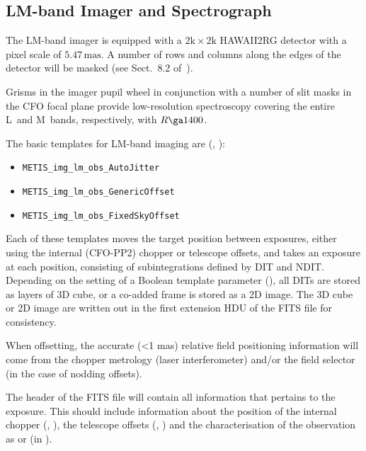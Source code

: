 
\subsection{LM-band Imager and Spectrograph}
\label{ssec:instrument_data_LM-IMG}

The LM-band imager is equipped with a $2\mathrm{k}\times2\mathrm{k}$
HAWAII2RG detector with a pixel scale of $5.47\,\mathrm{mas}$. A
number of rows and columns along the edges of the detector will be
masked (see Sect.~8.2 of~\cite{DRLS}).

Grisms in the imager pupil wheel in conjunction with a number of slit
masks in the CFO focal plane provide low-resolution spectroscopy
covering the entire L~and M~bands, respectively, with $R\ga 1400$.

The basic templates for LM-band imaging are
(\cite{METIS-operational_concept}, \cite{METIS-template_manual}):
\begin{itemize}
\item \lstinline{METIS_img_lm_obs_AutoJitter}
\item \lstinline{METIS_img_lm_obs_GenericOffset}
\item \lstinline{METIS_img_lm_obs_FixedSkyOffset}
\end{itemize}

Each of these templates moves the target position between exposures,
either using the internal (CFO-PP2) chopper or telescope offsets, and
takes an exposure at each position, consisting of subintegrations
defined by DIT and NDIT. Depending on the setting of a Boolean
template parameter (), all DITs are stored as
layers of 3D cube, or a co-added frame is stored as a 2D image.
The 3D cube or 2D image are written out in the first extension HDU of the FITS file for consistency.

When offsetting, the accurate (<1 mas) relative field positioning information will come from the chopper metrology (laser interferometer) and/or the field selector (in the case of nodding offsets).

The header of the FITS file will contain all information that pertains
to the exposure. This should include information about the position of
the internal chopper (,
), the telescope offsets (,
) and the characterisation of the observation as
 or  (in ).

